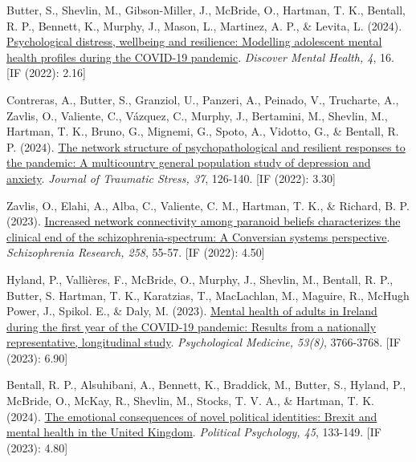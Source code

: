 \documentclass[12pt]{article}
\begin{document}
\begin{bibenum}
\item Butter, S., Shevlin, M., Gibson-Miller, J., McBride, O.,
		Hartman, T. K.,  Bentall, R. P., Bennett, K., Murphy, J.,
		Mason, L., Martinez, A. P., \& Levita, L. (2024).
		\href{https://doi.org/10.1007/s44192-024-00071-8}
		{Psychological distress, wellbeing and resilience: 
		Modelling adolescent mental health profiles during 
		the COVID-19 pandemic}. 
		\emph{Discover Mental Health, 4}, 16. [IF (2022): 2.16]


\item Contreras, A., Butter, S., Granziol, U., Panzeri, A., 
		Peinado, V., Trucharte, A., Zavlis, O., Valiente, C.,
		Vázquez, C., Murphy, J., Bertamini, M., Shevlin, M.,
		Hartman, T. K., Bruno, G., Mignemi, G., Spoto, A., 
		Vidotto, G., \& Bentall, R. P. (2024). 
		\href{https://doi.org/10.1002/jts.22988}
		{The network 
		structure of psychopathological and resilient 
		responses to the pandemic: A multicountry 
		general population study of depression and anxiety}. 
		\emph{Journal of Traumatic Stress, 37}, 126-140. [IF (2022): 3.30]
		
\item Zavlis, O., Elahi, A., Alba, C., Valiente, C. M., 
		Hartman, T. K., \& Richard, B. P. (2023). 
		\href{https://doi.org/10.1016/j.schres.2023.07.016}
		{Increased network connectivity among paranoid 
		beliefs characterizes the clinical end of the 
		schizophrenia-spectrum: A Conversian systems 
		perspective}. 
		\emph{Schizophrenia Research, 258}, 55-57.
		[IF (2022): 4.50]
		
\item Hyland, P., Vallières, F., McBride, O., Murphy, J., 
		Shevlin, M., Bentall, R. P., Butter, S. 
		Hartman, T. K., Karatzias, T., MacLachlan, M., 
		Maguire, R., McHugh Power, J., Spikol. E., 
		\& Daly, M. (2023). 
		\href{https://doi.org/10.1017/S0033291721004360}
		{Mental health of adults in Ireland during the 
		first year of the COVID-19 pandemic: Results 
		from a nationally representative, longitudinal 
		study}. 
		\emph{Psychological Medicine, 53(8)}, 3766-3768.
		[IF (2023): 6.90]

\item Bentall, R. P., Alsuhibani, A., Bennett, K.,
		 Braddick, M., Butter, S., Hyland, P., 
		 McBride, O., McKay, R., Shevlin, M.,
		 Stocks, T. V. A., \& Hartman, T. K. (2024). 
      \href{https://doi.org/10.1111/pops.12923}
          {The emotional consequences of novel political 
           identities: Brexit and mental health 
           in the United Kingdom}. 
          \emph{Political Psychology, 45}, 133-149. 
          [IF (2023): 4.80]


\end{bibenum}
\end{document}
